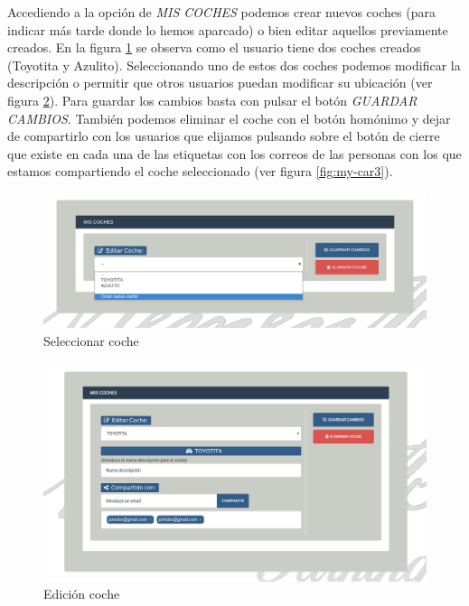 Accediendo a la opción de \textit{MIS COCHES} podemos crear nuevos coches (para indicar más tarde donde lo hemos aparcado) o bien editar aquellos previamente creados. En la figura \ref{fig:my-car} se observa como el usuario tiene dos coches creados (Toyotita y Azulito). Seleccionando uno de estos dos coches podemos modificar la descripción o permitir que otros usuarios puedan modificar su ubicación (ver figura \ref{fig:my-car2}). Para guardar los cambios basta con pulsar el botón \textit{GUARDAR CAMBIOS}. También podemos eliminar el coche con el botón homónimo y dejar de compartirlo con los usuarios que elijamos pulsando sobre el botón de cierre que existe en cada una de las etiquetas con los correos de las personas con los que estamos compartiendo el coche seleccionado (ver figura \ref{fig:my-car3}).

	\begin{figure}[h!]
		\centering
		\includegraphics[width=15cm, fbox={\fboxrule} 4mm]{images/06-manual/07-my_car.png}
		\caption{Seleccionar coche}
		\label{fig:my-car}
	\end{figure}
	
	\begin{figure}[h!]
		\centering
		\includegraphics[width=15cm, fbox={\fboxrule} 4mm]{images/06-manual/08-my_car2.png}
		\caption{Edición coche}
		\label{fig:my-car2}
	\end{figure}

